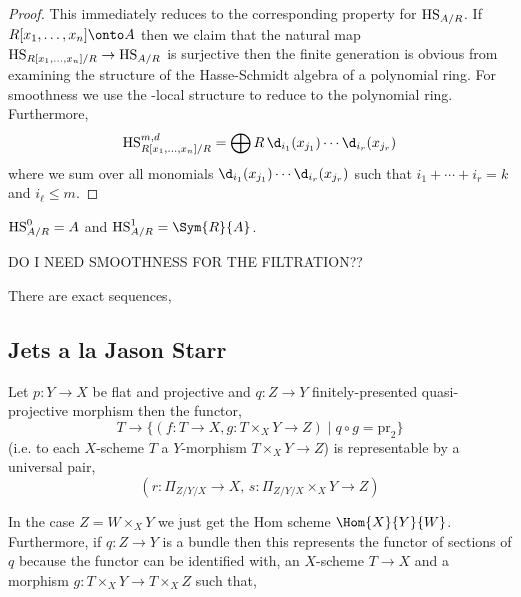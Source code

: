 \documentclass[12pt]{article}
\begin{document}
\begin{proof}
This immediately reduces to the corresponding property for $\mathrm{HS}_{A/R}$. If $R[x_1, \dots, x_n] \onto A$ then we claim that the natural map $\mathrm{HS}_{R[x_1, \dots, x_n]/R} \to \mathrm{HS}_{A/R}$ is surjective then the finite generation is obvious from examining the structure of the Hasse-Schmidt algebra of a polynomial ring. For smoothness we use the \etale-local structure to reduce to the polynomial ring. Furthermore,
\[ \HS_{R[x_1, \dots, x_n]/R}^{m,d} = \bigoplus R \, \d_{i_1}(x_{j_1}) \cdots \d_{i_r}(x_{j_r}) \]
where we sum over all monomials $\d_{i_1}(x_{j_1}) \cdots \d_{i_r}(x_{j_r})$ such that $i_1 + \cdots + i_r = k$ and $i_{\ell} \le m$. 
\end{proof}

\begin{example}
$\mathrm{HS}^0_{A/R} = A$ and $\HS^1_{A/R} = \Sym{R}{A}$.
\end{example}

{\color{red} DO I NEED SMOOTHNESS FOR THE FILTRATION??}

\begin{prop}
There are exact sequences,
\end{prop}


\subsection{Jets a la Jason Starr}

\newcommand{\pr}{\mathrm{pr}}

\begin{theorem}[FGA IV.3 p.267]
Let $p : Y \to X$ be flat and projective and $q : Z \to Y$ finitely-presented quasi-projective morphism then the functor,
\[ T \to \{ (f : T \to X, g : T \times_X Y \to Z) \mid q \circ g = \pr_2 \} \]
(i.e. to each $X$-scheme $T$ a $Y$-morphism $T \times_X Y \to Z$)
is representable by a universal pair,
\[ (r : \Pi_{Z/Y/X} \to X, \, s : \Pi_{Z/Y/X} \times_X Y \to Z) \]
\end{theorem}

\begin{rmk}
In the case $Z = W \times_X Y$ we just get the Hom scheme $\Hom{X}{Y}{W}$. Furthermore, if $q : Z \to Y$ is a bundle then this represents the functor of sections of $q$ because  the functor can be identified with, an $X$-scheme $T \to X$ and a morphism $g : T \times_X Y \to T \times_X Z$ such that,
\begin{center}
\end{center}  
\end{rmk}
\end{document}
